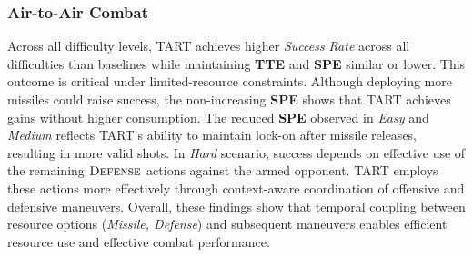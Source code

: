 \subsubsection{Air-to-Air Combat}
Across all difficulty levels, TART achieves higher \emph{Success Rate} across all difficulties than baselines while maintaining \textbf{TTE} and \textbf{SPE} similar or lower.
This outcome is critical under limited-resource constraints.
Although deploying more missiles could raise success, the non-increasing \textbf{SPE} shows that TART achieves gains without higher consumption.
The reduced \textbf{SPE} observed in \textit{Easy} and \textit{Medium} reflects TART's ability to maintain lock-on after missile releases, resulting in more valid shots.
In \textit{Hard} scenario, success depends on effective use of the remaining $\textsc{Defense}$ actions against the armed opponent.
TART employs these actions more effectively through context-aware coordination of offensive and defensive maneuvers.
Overall, these findings show that temporal coupling between resource options (\emph{Missile, Defense}) and subsequent maneuvers enables efficient resource use and effective combat performance.